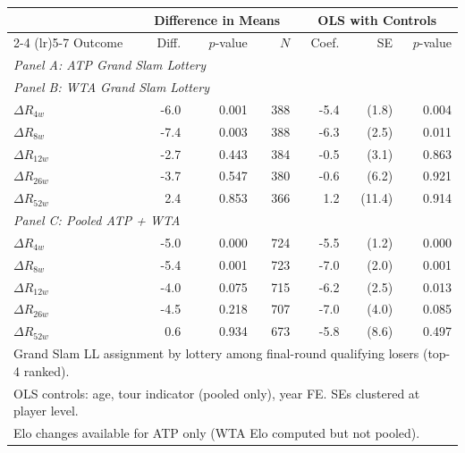 \begin{tabular}{lrrrrrr}
\toprule
 & \multicolumn{3}{c}{Difference in Means} & \multicolumn{3}{c}{OLS with Controls} \\
\cmidrule(lr){2-4} \cmidrule(lr){5-7}
Outcome & Diff. & $p$-value & $N$ & Coef. & SE & $p$-value \\
\midrule
\multicolumn{7}{l}{\textit{Panel A: ATP Grand Slam Lottery}} \\
\midrule
\multicolumn{7}{l}{\textit{Panel B: WTA Grand Slam Lottery}} \\
$\Delta R_{4w}$ & -6.0 & 0.001 & 388 & -5.4 & (1.8) & 0.004 \\
$\Delta R_{8w}$ & -7.4 & 0.003 & 388 & -6.3 & (2.5) & 0.011 \\
$\Delta R_{12w}$ & -2.7 & 0.443 & 384 & -0.5 & (3.1) & 0.863 \\
$\Delta R_{26w}$ & -3.7 & 0.547 & 380 & -0.6 & (6.2) & 0.921 \\
$\Delta R_{52w}$ & 2.4 & 0.853 & 366 & 1.2 & (11.4) & 0.914 \\
\midrule
\multicolumn{7}{l}{\textit{Panel C: Pooled ATP + WTA}} \\
$\Delta R_{4w}$ & -5.0 & 0.000 & 724 & -5.5 & (1.2) & 0.000 \\
$\Delta R_{8w}$ & -5.4 & 0.001 & 723 & -7.0 & (2.0) & 0.001 \\
$\Delta R_{12w}$ & -4.0 & 0.075 & 715 & -6.2 & (2.5) & 0.013 \\
$\Delta R_{26w}$ & -4.5 & 0.218 & 707 & -7.0 & (4.0) & 0.085 \\
$\Delta R_{52w}$ & 0.6 & 0.934 & 673 & -5.8 & (8.6) & 0.497 \\
\midrule
\multicolumn{7}{l}{\footnotesize Grand Slam LL assignment by lottery among final-round qualifying losers (top-4 ranked).} \\
\multicolumn{7}{l}{\footnotesize OLS controls: age, tour indicator (pooled only), year FE. SEs clustered at player level.} \\
\multicolumn{7}{l}{\footnotesize Elo changes available for ATP only (WTA Elo computed but not pooled).} \\
\bottomrule
\end{tabular}

